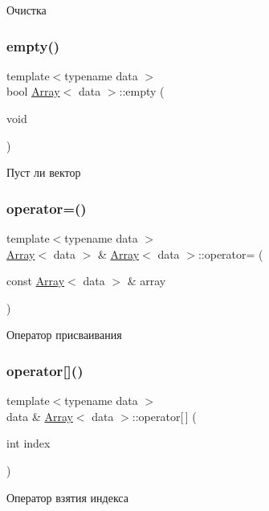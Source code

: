 Очистка \mbox{\label{classArray_ad8c05cc24898f72f43fbb16502c82ae8}} 
\subsubsection{\texorpdfstring{empty()}{empty()}}
{\footnotesize\ttfamily template$<$typename data $>$ \\
bool \hyperlink{classArray}{Array}$<$ data $>$\+::empty (\begin{DoxyParamCaption}\item[{void}]{ }\end{DoxyParamCaption})}

Пуст ли вектор \mbox{\label{classArray_a7b110602f7b7d0a809e0866d5a5a5d3c}} 
\subsubsection{\texorpdfstring{operator=()}{operator=()}}
{\footnotesize\ttfamily template$<$typename data $>$ \\
\hyperlink{classArray}{Array}$<$ data $>$ \& \hyperlink{classArray}{Array}$<$ data $>$\+::operator= (\begin{DoxyParamCaption}\item[{const \hyperlink{classArray}{Array}$<$ data $>$ \&}]{array }\end{DoxyParamCaption})}

Оператор присваивания \mbox{\label{classArray_a67e1907d0309d06863839d2a7f4a5476}} 
\subsubsection{\texorpdfstring{operator[]()}{operator[]()}}
{\footnotesize\ttfamily template$<$typename data $>$ \\
data \& \hyperlink{classArray}{Array}$<$ data $>$\+::operator\mbox{[}$\,$\mbox{]} (\begin{DoxyParamCaption}\item[{int}]{index }\end{DoxyParamCaption})}

Оператор взятия индекса \mbox{\label{classArray_a096d7544dd95195f57f88b0fde76fe68}} 
